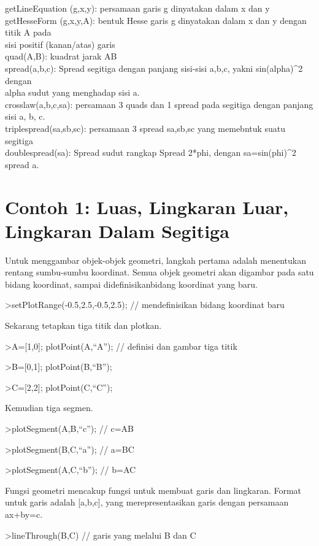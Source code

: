 \documentclass[
]{book}
\begin{document}
getLineEquation (g,x,y): persamaan garis g dinyatakan dalam x dan y\\
getHesseForm (g,x,y,A): bentuk Hesse garis g dinyatakan dalam x dan y dengan titik A pada\\
sisi positif (kanan/atas) garis\\
quad(A,B): kuadrat jarak AB\\
spread(a,b,c): Spread segitiga dengan panjang sisi-sisi a,b,c, yakni sin(alpha)\^{}2 dengan\\
alpha sudut yang menghadap sisi a.\\
crosslaw(a,b,c,sa): persamaan 3 quads dan 1 spread pada segitiga dengan panjang sisi a, b, c.\\
triplespread(sa,sb,sc): persamaan 3 spread sa,sb,sc yang memebntuk suatu segitiga\\
doublespread(sa): Spread sudut rangkap Spread 2*phi, dengan sa=sin(phi)\^{}2 spread a.

\chapter{Contoh 1: Luas, Lingkaran Luar, Lingkaran Dalam Segitiga}\label{contoh-1-luas-lingkaran-luar-lingkaran-dalam-segitiga}

Untuk menggambar objek-objek geometri, langkah pertama adalah menentukan rentang sumbu-sumbu koordinat. Semua objek geometri akan digambar pada satu bidang koordinat, sampai didefinisikanbidang koordinat yang baru.

\textgreater setPlotRange(-0.5,2.5,-0.5,2.5); // mendefinisikan bidang koordinat baru

Sekarang tetapkan tiga titik dan plotkan.

\textgreater A={[}1,0{]}; plotPoint(A,``A''); // definisi dan gambar tiga titik

\textgreater B={[}0,1{]}; plotPoint(B,``B'');

\textgreater C={[}2,2{]}; plotPoint(C,``C'');

Kemudian tiga segmen.

\textgreater plotSegment(A,B,``c''); // c=AB

\textgreater plotSegment(B,C,``a''); // a=BC

\textgreater plotSegment(A,C,``b''); // b=AC

Fungsi geometri mencakup fungsi untuk membuat garis dan lingkaran. Format untuk garis adalah {[}a,b,c{]}, yang merepresentasikan garis dengan persamaan ax+by=c.

\textgreater lineThrough(B,C) // garis yang melalui B dan C
\end{document}
